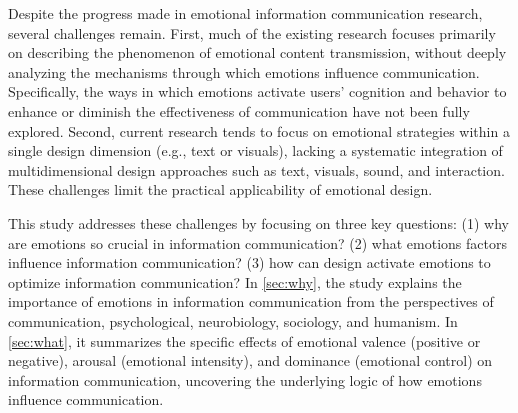Despite the progress made in emotional information communication research, several challenges remain. First, much of the existing research focuses primarily on describing the phenomenon of emotional content transmission, without deeply analyzing the mechanisms through which emotions influence communication.  Specifically, the ways in which emotions activate users’ cognition and behavior to enhance or diminish the effectiveness of communication have not been fully explored.  Second, current research tends to focus on emotional strategies within a single design dimension (e.g., text or visuals), lacking a systematic integration of multidimensional design approaches such as text, visuals, sound, and interaction.  These challenges limit the practical applicability of emotional design.
        

This study addresses these challenges by focusing on three key questions:
(1) why are emotions so crucial in information communication?
(2) what emotions factors influence information communication?
(3) how can design activate emotions to optimize information communication?
In \cref{sec:why}, the study explains the importance of emotions in information communication from the perspectives of communication, psychological, neurobiology, sociology,  and humanism. In \cref{sec:what}, it summarizes the specific effects of emotional valence (positive or negative), arousal (emotional intensity), and dominance (emotional control) on information communication, uncovering the underlying logic of how emotions influence communication.

\enlargethispage{-1cm}


